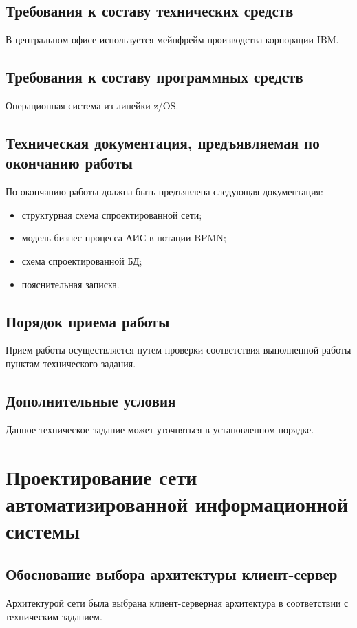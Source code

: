 \documentclass[russian,utf8,emptystyle]{eskdtext}
\begin{document}
\subsection{Требования к составу технических средств}
В центральном офисе используется мейнфрейм производства корпорации IBM.

\subsection{Требования к составу программных средств}
Операционная система из линейки z/OS.

\subsection{Техническая документация, предъявляемая по окончанию работы}
По окончанию работы должна быть предъявлена следующая документация:
\begin{itemize}[label=-]
\item структурная схема спроектированной сети;
\item модель бизнес-процесса АИС в нотации BPMN;
\item схема спроектированной БД;
\item пояснительная записка.
\end{itemize}

\subsection{Порядок приема работы}
Прием работы осуществляется путем проверки соответствия выполненной работы пунктам технического задания.

\subsection{Дополнительные условия}
Данное техническое задание может уточняться в установленном порядке.

\clearpage
\section{Проектирование сети автоматизированной информационной системы}
\subsection{Обоснование выбора архитектуры клиент-сервер}

Архитектурой сети была выбрана клиент-серверная архитектура в соответствии с техническим заданием. 
\end{document}
